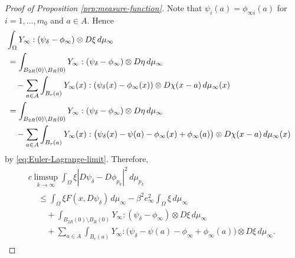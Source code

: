 \documentclass[a4paper]{article}
\theoremstyle{definition}
\theoremstyle{remark}
\begin{document}
\begin{proof}[Proof of Proposition \ref{prp:measure-function}]
Note that $\psi_i(a) = \phi_{\infty i}(a)$ for $i = 1, \dotsc, m_0$ and $a \in A$. Hence
\[
\begin{split}
\lefteqn{\int_\Omega Y_\infty : (\psi_\delta - \phi_\infty) \otimes D\xi \, d\mu_\infty} \\
& = \int_{B_{2R}(0) \setminus B_R(0)} Y_\infty : (\psi_\delta - \phi_\infty) \otimes D\eta \, d\mu_\infty \\
& \quad - \sum_{a \in A} \int_{B_r(a)} Y_\infty(x) : (\psi_\delta(x) - \phi_\infty(x)) \otimes D\chi(x - a) \, d\mu_\infty(x) \\
& = \int_{B_{2R}(0) \setminus B_R(0)} Y_\infty : (\psi_\delta - \phi_\infty) \otimes D\eta \, d\mu_\infty \\
& \quad - \sum_{a \in A} \int_{B_r(a)} Y_\infty(x) : \bigl(\psi_\delta(x) - \psi(a) - \phi_\infty(x) + \phi_\infty(a)\bigr) \otimes D\chi(x - a) \, d\mu_\infty(x)
\end{split}
\]
by \eqref{eq:Euler-Lagrange-limit}. Therefore,
\begin{multline*}
c \limsup_{k \to \infty} \int_\Omega \xi |D\psi_\delta - D\phi_{p_k}|^2 \, d\mu_{p_k} \\
\begin{aligned}
& \le \int_\Omega \xi F(x, D\psi_\delta) \, d\mu_\infty - \beta^2 e_\infty^2 \int_\Omega \xi \, d\mu_\infty \\
& \quad + \int_{B_{2R}(0) \setminus B_R(0)} Y_\infty : (\psi_\delta - \phi_\infty) \otimes D\xi \, d\mu_\infty \\
& \quad + \sum_{a \in A} \int_{B_r(a)} Y_\infty : \bigl(\psi_\delta - \psi(a) - \phi_\infty + \phi_\infty(a)\bigr) \otimes D\xi \, d\mu_\infty.
\end{aligned}
\end{multline*}


\end{proof}
\end{document}
